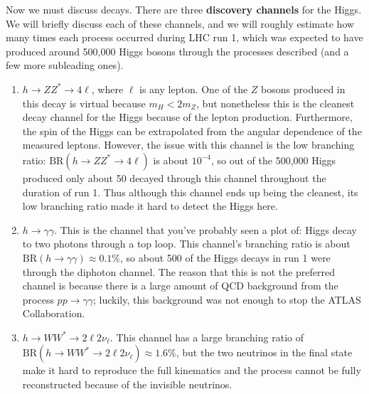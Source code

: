 \documentclass[11pt, oneside]{article}   	%
\theoremstyle{definition}
\numberwithin{equation}{subsection}		%
\begin{document}
Now we must discuss decays. There are three \textbf{discovery channels} for the Higgs. We will briefly discuss each of these channels, and 
we will roughly estimate how many times each process occurred during LHC run 1, which was expected to have produced around 500,000 
Higgs bosons through the processes described (and a few more subleading ones). 
\begin{enumerate}
	\item $h\rightarrow ZZ^*\rightarrow 4\ell$, where $\ell$ is any lepton. One of the $Z$ bosons produced in this decay is virtual because 
	$m_H < 2 m_Z$, but nonetheless this is the cleanest decay channel for the Higgs because of the lepton production. Furthermore, the spin 
	of the Higgs can be extrapolated from the angular dependence of the measured leptons. However, the issue with this channel is the low 
	branching ratio: $\mathrm{BR}(h\rightarrow ZZ^*\rightarrow 4\ell)$ is about $10^{-4}$, so out of the 500,000 Higgs produced only about 
	50 decayed through this channel throughout the duration of run 1. Thus although this channel ends up being the cleanest, its low branching 
	ratio made it hard to detect the Higgs here.
	\item $h\rightarrow \gamma\gamma$. This is the channel that you've probably seen a plot of: Higgs decay to two photons through a top loop. 
	This channel's branching ratio is about $\mathrm{BR}(h\rightarrow\gamma\gamma)\approx 0.1\%$, so about 500 of the 
	Higgs decays in run 1 were through the diphoton channel. The reason that this is not the preferred channel is because there is a large amount 
	of QCD background from the process $pp\rightarrow\gamma\gamma$; luckily, this background was not enough to stop the ATLAS 
	Collaboration.
	\item $h\rightarrow WW^*\rightarrow 2\ell 2\nu_\ell$. This channel has a large branching ratio of $\mathrm{BR}(h\rightarrow WW^*
	\rightarrow 2\ell 2\nu_\ell)\approx 1.6\%$, but the two neutrinos in the final state make it hard to reproduce the full kinematics and 
	the process cannot be fully reconstructed because of the invisible neutrinos. 
\end{enumerate}
\end{document}
